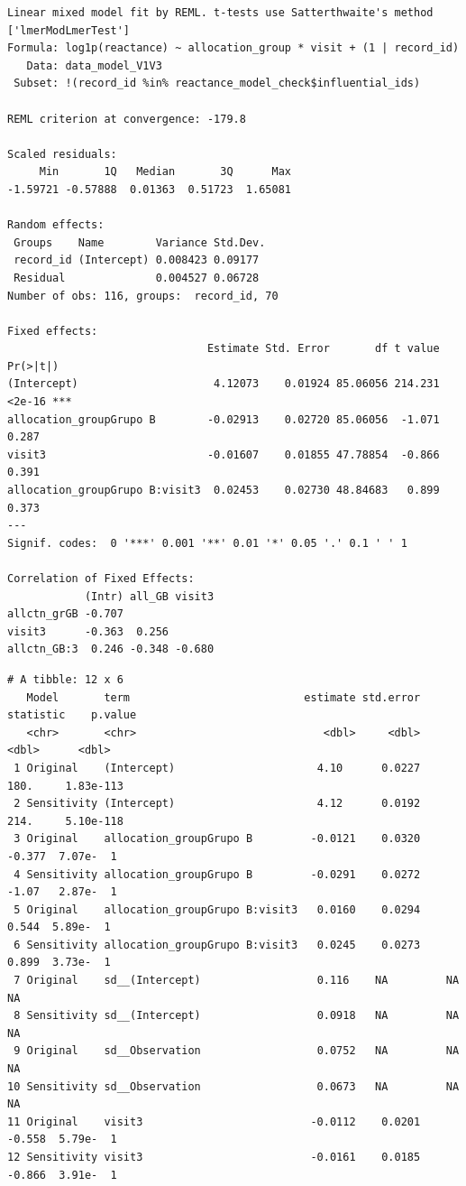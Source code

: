 \documentclass[
  12pt,
]{article}
\newenvironment{Shaded}{\begin{snugshade}}{\end{snugshade}}
\newcommand{\NormalTok}[1]{\textcolor[rgb]{0.00,0.23,0.31}{#1}}
\newcommand{\SpecialCharTok}[1]{\textcolor[rgb]{0.37,0.37,0.37}{#1}}
\begin{document}
\begin{verbatim}
Linear mixed model fit by REML. t-tests use Satterthwaite's method ['lmerModLmerTest']
Formula: log1p(reactance) ~ allocation_group * visit + (1 | record_id)
   Data: data_model_V1V3
 Subset: !(record_id %in% reactance_model_check$influential_ids)

REML criterion at convergence: -179.8

Scaled residuals: 
     Min       1Q   Median       3Q      Max 
-1.59721 -0.57888  0.01363  0.51723  1.65081 

Random effects:
 Groups    Name        Variance Std.Dev.
 record_id (Intercept) 0.008423 0.09177 
 Residual              0.004527 0.06728 
Number of obs: 116, groups:  record_id, 70

Fixed effects:
                               Estimate Std. Error       df t value Pr(>|t|)    
(Intercept)                     4.12073    0.01924 85.06056 214.231   <2e-16 ***
allocation_groupGrupo B        -0.02913    0.02720 85.06056  -1.071    0.287    
visit3                         -0.01607    0.01855 47.78854  -0.866    0.391    
allocation_groupGrupo B:visit3  0.02453    0.02730 48.84683   0.899    0.373    
---
Signif. codes:  0 '***' 0.001 '**' 0.01 '*' 0.05 '.' 0.1 ' ' 1

Correlation of Fixed Effects:
            (Intr) all_GB visit3
allctn_grGB -0.707              
visit3      -0.363  0.256       
allctn_GB:3  0.246 -0.348 -0.680
\end{verbatim}

\begin{Shaded}
\end{Shaded}

\begin{verbatim}
# A tibble: 12 x 6
   Model       term                           estimate std.error statistic    p.value
   <chr>       <chr>                             <dbl>     <dbl>     <dbl>      <dbl>
 1 Original    (Intercept)                      4.10      0.0227   180.     1.83e-113
 2 Sensitivity (Intercept)                      4.12      0.0192   214.     5.10e-118
 3 Original    allocation_groupGrupo B         -0.0121    0.0320    -0.377  7.07e-  1
 4 Sensitivity allocation_groupGrupo B         -0.0291    0.0272    -1.07   2.87e-  1
 5 Original    allocation_groupGrupo B:visit3   0.0160    0.0294     0.544  5.89e-  1
 6 Sensitivity allocation_groupGrupo B:visit3   0.0245    0.0273     0.899  3.73e-  1
 7 Original    sd__(Intercept)                  0.116    NA         NA     NA        
 8 Sensitivity sd__(Intercept)                  0.0918   NA         NA     NA        
 9 Original    sd__Observation                  0.0752   NA         NA     NA        
10 Sensitivity sd__Observation                  0.0673   NA         NA     NA        
11 Original    visit3                          -0.0112    0.0201    -0.558  5.79e-  1
12 Sensitivity visit3                          -0.0161    0.0185    -0.866  3.91e-  1
\end{verbatim}
\end{document}
